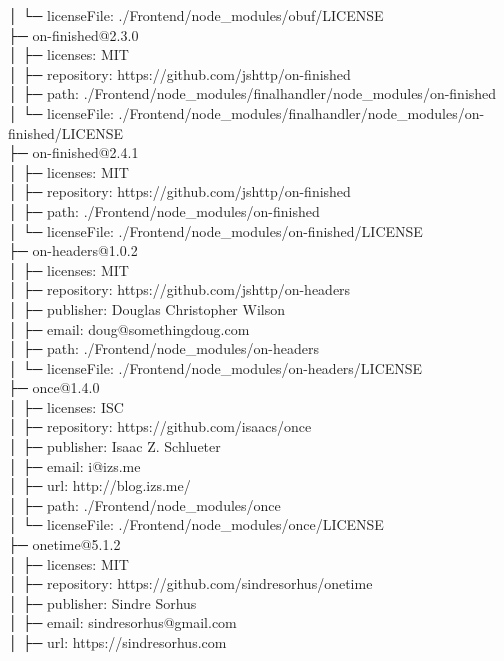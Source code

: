 │  └─ licenseFile: ./Frontend/node\_modules/obuf/LICENSE\\
├─ on-finished@2.3.0\\
│  ├─ licenses: MIT\\
│  ├─ repository: https://github.com/jshttp/on-finished\\
│  ├─ path: ./Frontend/node\_modules/finalhandler/node\_modules/on-finished\\
│  └─ licenseFile: ./Frontend/node\_modules/finalhandler/node\_modules/on-finished/LICENSE\\
├─ on-finished@2.4.1\\
│  ├─ licenses: MIT\\
│  ├─ repository: https://github.com/jshttp/on-finished\\
│  ├─ path: ./Frontend/node\_modules/on-finished\\
│  └─ licenseFile: ./Frontend/node\_modules/on-finished/LICENSE\\
├─ on-headers@1.0.2\\
│  ├─ licenses: MIT\\
│  ├─ repository: https://github.com/jshttp/on-headers\\
│  ├─ publisher: Douglas Christopher Wilson\\
│  ├─ email: doug@somethingdoug.com\\
│  ├─ path: ./Frontend/node\_modules/on-headers\\
│  └─ licenseFile: ./Frontend/node\_modules/on-headers/LICENSE\\
├─ once@1.4.0\\
│  ├─ licenses: ISC\\
│  ├─ repository: https://github.com/isaacs/once\\
│  ├─ publisher: Isaac Z. Schlueter\\
│  ├─ email: i@izs.me\\
│  ├─ url: http://blog.izs.me/\\
│  ├─ path: ./Frontend/node\_modules/once\\
│  └─ licenseFile: ./Frontend/node\_modules/once/LICENSE\\
├─ onetime@5.1.2\\
│  ├─ licenses: MIT\\
│  ├─ repository: https://github.com/sindresorhus/onetime\\
│  ├─ publisher: Sindre Sorhus\\
│  ├─ email: sindresorhus@gmail.com\\
│  ├─ url: https://sindresorhus.com\\
